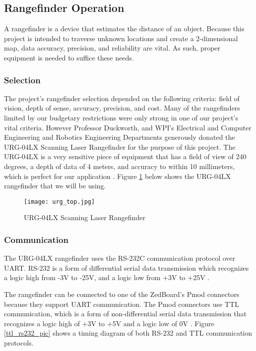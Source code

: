 \subsection{Rangefinder Operation}
A rangefinder is a device that estimates the distance of an object. Because this project is intended to traverse unknown locations and create a 2-dimensional map, data accuracy, precision, and reliability are vital. As such, proper equipment is needed to suffice these needs. 

\subsubsection{Selection}
The project's rangefinder selection depended on the following criteria: field of vision, depth of sense, accuracy, precision, and cost. Many of the rangefinders limited by our budgetary restrictions were only strong in one of our project's vital criteria. However Professor Duckworth, and WPI's Electrical and Computer Engineering and Robotics Engineering Departments generously donated the URG-04LX Scanning Laser Rangefinder for the purpose of this project. The URG-04LX is a very sensitive piece of equipment that has a field of view of 240 degrees, a depth of data of 4 meters, and accuracy to within 10 millimeters, which is perfect for our application \cite{urg04lx_specifications}. Figure \ref{rangefinder_pic} below shows the URG-04LX rangefinder that we will be using.

\begin{figure}[H]
	\centerline{\texttt{[image: urg\_top.jpg]}}
	\caption{URG-04LX Scanning Laser Rangefinder \cite{rangefinder_photo}}
	\label{rangefinder_pic}
\end{figure}

\subsubsection{Communication}
The URG-04LX rangefinder uses the RS-232C communication protocol over UART. RS-232 is a form of differential serial data transmission which recognizes a logic high from -3V to -25V, and a logic low from +3V to +25V \cite{rs232}.
\par
The rangefinder can be connected to one of the ZedBoard's Pmod connectors because they support UART communication. The Pmod connectors use TTL communication, which is a form of non-differential serial data transmission that recognizes a logic high of +3V to +5V and a logic low of 0V \cite{ttl}. Figure \ref{ttl_rs232_pic} shows a timing diagram of both RS-232 and TTL communication protocols.

